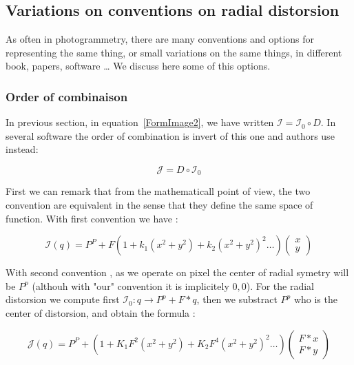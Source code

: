 \subsection{Variations on  conventions on radial distorsion}

As often in photogrammetry, there are many conventions and options for representing the same thing,
or small variations on the same things, in different book, papers, software \dots
We discuss here some of this options.


\subsubsection{Order of combinaison}

In previous section, in equation~\ref{FormImage2}, we have written  $ \mathcal{I} = \mathcal{I}_0  \circ D \label{FormImage2}$.
In several software the order of combination is invert of this one and authors use instead:

\begin{equation}
	\mathcal{J} = D \circ  \mathcal{I}_0  
\end{equation}

First we can remark that from the mathematicall point of view, the two convention are equivalent in the sense
that they define the same space of function.  With first convention we have :

\begin{equation}
	\mathcal{I}(q) = P^P + F (1 + k_1 (x^2+y^2) +  k_2 (x^2+y^2) ^2 \dots)  \begin{pmatrix} x \\ y \end{pmatrix}
\end{equation}

With second convention , as we operate on pixel the center of radial symetry will  be $P^p$ 
(althouh with "our" convention it is implicitely $0,0$). For the radial distorsion 
we compute first  $  \mathcal{I}_0 : q \rightarrow  P^p + F*q$, then we substract 
$P^p$  who is the center of distorsion, and obtain the formula :

\begin{equation}
	\mathcal{J}(q) = P^P + (1 + K_1 F^2 (x^2+y^2) +  K_2  F^4 (x^2+y^2) ^2 \dots)  \begin{pmatrix} F*x \\ F*y \end{pmatrix}
\end{equation}


